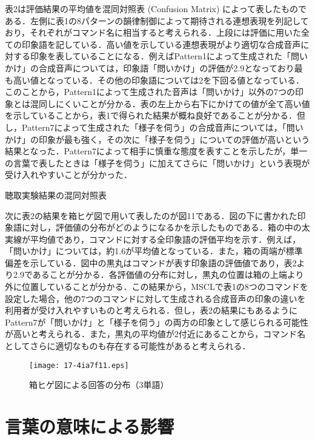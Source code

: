\documentclass[japanese]{jnlp_1.4}
\begin{document}
表2は評価結果の平均値を混同対照表 (Confusion Matrix) によって表したものである．左側に表1の8パターンの韻律制御によって期待される連想表現を列記しており，それぞれがコマンド名に相当すると考えられる．上段には評価に用いた全ての印象語を記している．高い値を示している連想表現がより適切な合成音声に対する印象を表していることになる．例えばPattern1によって生成された「問いかけ」の合成音声については，印象語「問いかけ」の評価が2.9となっており最も高い値となっている．その他の印象語については2を下回る値となっている．このことから，Pattern1によって生成された音声は「問いかけ」以外の7つの印象とは混同しにくいことが分かる．表の左上から右下にかけての値が全て高い値を示していることから，表1で得られた結果が概ね良好であることが分かる．但し，Pattern7によって生成された「様子を伺う」の合成音声については，「問いかけ」の印象が最も強く，その次に「様子を伺う」についての評価が高いという結果となった．Pattern7によって相手に慎重な態度を表すことを示したが，単一の言葉で表したときは「様子を伺う」に加えてさらに「問いかけ」という表現が受け入れやすいことが分かった．

\begin{table}[t]
\caption{聴取実験結果の混同対照表}

\end{table}

次に表2の結果を箱ヒゲ図で用いて表したのが図11である．図の下に書かれた印象語に対し，評価値の分布がどのようになるかを示したものである．箱の中の太実線が平均値であり，コマンドに対する全印象語の評価平均を示す．例えば，「問いかけ」については，約1.6が平均値となっている．また，箱の両端が標準偏差を示している．図中の黒丸はコマンドが表す印象語の評価値であり，表2より2.9であることが分かる．各評価値の分布に対し，黒丸の位置は箱の上端より外に位置していることが分かる．この結果から，MSCLで表1の8つのコマンドを設定した場合，他の7つのコマンドに対して生成される合成音声の印象の違いを利用者が受け入れやすいものと考えられる．但し，表2の結果にもあるようにPattern7が「問いかけ」と「様子を伺う」の両方の印象として感じられる可能性が高いと考えられる．また，黒丸の平均値が2付近にあることから，コマンド名としてさらに適切なものも存在する可能性があると考えられる．

\begin{figure}[t]
\begin{center}
 \texttt{[image: 17-4ia7f11.eps]}
\end{center}
\caption{箱ヒゲ図による回答の分布（3単語）}
\end{figure}

\section{言葉の意味による影響}
\end{document}
